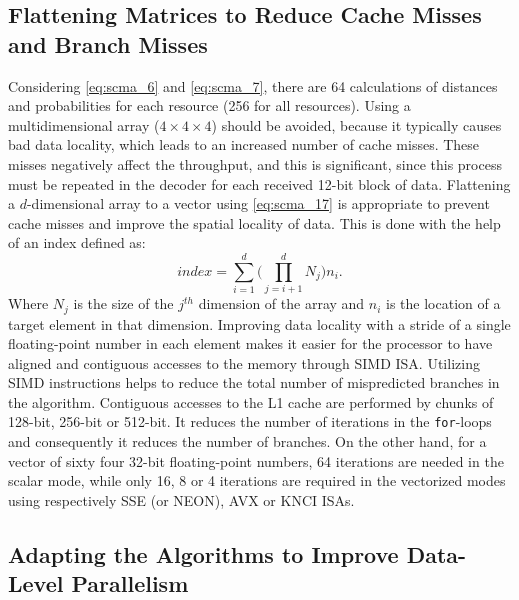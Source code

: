 \subsection{Flattening Matrices to Reduce Cache Misses and Branch Misses}
\label{sec:opt_scma_flattening}

Considering \eqref{eq:scma_6} and \eqref{eq:scma_7}, there are 64 calculations
of distances and probabilities for each resource (256 for all resources). Using
a multidimensional array ($4\times4\times4$) should be avoided, because it
typically causes bad data locality, which leads to an increased number of cache
misses. These misses negatively affect the throughput, and this is significant,
since this process must be repeated in the decoder for each received 12-bit
block of data. Flattening a $d$-dimensional array to a vector using
\eqref{eq:scma_17} is appropriate to prevent cache misses and improve the
spatial locality of data. This is done with the help of an index defined as:
\begin{equation}
  \label{eq:scma_17}
  index = \sum\limits_{i=1}^d\Bigg( \prod\limits_{j=i+1}^d N_j \Bigg)n_i.
\end{equation}
Where $N_j$ is the size of the $j^{th}$ dimension of the array and $n_i$ is the
location of a target element in that dimension. Improving data locality with
a stride of a single floating-point number in each element makes it easier for
the processor to have aligned and contiguous accesses to the memory through SIMD
ISA. Utilizing SIMD instructions helps to reduce the total number of
mispredicted branches in the algorithm. Contiguous accesses to the L1 cache are
performed by chunks of 128-bit, 256-bit or 512-bit. It reduces the number of
iterations in the \verb|for|-loops and consequently it reduces the number of
branches. On the other hand, for a vector of sixty four 32-bit floating-point
numbers, 64 iterations are needed in the scalar mode, while only 16, 8 or 4
iterations are required in the vectorized modes using respectively SSE (or
NEON), AVX or KNCI ISAs.

\subsection{Adapting the Algorithms to Improve Data-Level Parallelism}
\label{sec:opt_scma_adapting_algorithms}

